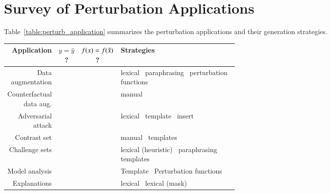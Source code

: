 \section{Survey of Perturbation Applications}

Table~\ref{table:perturb_application} summarizes the perturbation applications and their generation strategies.

\begin{table*}
\small
\centering
\begin{tabular}{r c c p{0.55\linewidth}}
\toprule
\textbf{Application} & \textbf{$y = \hat{y}$}? & $f(x) = f(\hat{x})$? & \textbf{Strategies} \\ 
\midrule
Data augmentation & \cmark & \qmark & 
    lexical~\cite{Wu2019ConditionalBC, Wei2019EDAED, Kumar2020DataAU}\newline
    paraphrasing~\cite{iyyer2018adversarial} \newline
    perturbation functions~\cite{ratner2017snorkel}
\\\midrule
Counterfactual data aug. & \xmark & \qmark & 
    manual~\cite{kaushik2019learning} \newline
\\\midrule
Adversarial attack & \cmark & \xmark & 
    lexical~\cite{alzantot2018generating, garg2020bae, li-etal-2020-bert-attack, morris2020textattack, tan2020s, jin2020bert, ebrahimi2017hotflip, Zhang2019GeneratingFA, Jia2019CertifiedRT} \newline
    template~\cite{jiang2019avoiding}\newline
    insert~\cite{Song2020UniversalAA}
\\\midrule
Contrast set & \xmark & \qmark & 
    manual~\cite{li2020linguistically} \newline
    templates~\cite{li2020linguistically}
\\\midrule
Challenge sets & \qmark & \qmark & 
    lexical (heuristic)~\cite{kaushik2019learning, naik2018stress} \newline
    paraphrasing~\cite{Kavumba2019WhenCP} \newline
    templates~\cite{Geiger2019PosingFG, kaushik2019learning, nie2019analyzing, mccoy2019right}
\\\midrule
Model analysis & \qmark & \qmark & 
    Template~\cite{Goodwin2020ProbingLS}\newline
    Perturbation functions~\cite{wu2019errudite, bowman-etal-2015-large}
\\\midrule
Explanations & \qmark & \qmark & 
    lexical~\cite{hase2020evaluating, vig2020causal, kang2020counterfactual} \newline
    lexical (mask)~\cite{ramon2019counterfactual, ribeiro2018anchors, }
\\
\bottomrule
\end{tabular}

\caption{Paper survey on the perturbation applications.}
\label{table:perturb_application}
\end{table*}
